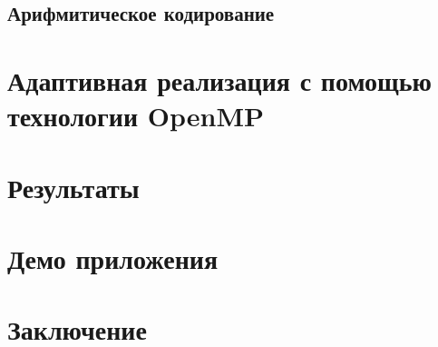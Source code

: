 \documentclass{matmex-diploma-custom}
\begin{document}
\subsection{Арифмитическое кодирование}
\section{Адаптивная реализация с помощью технологии OpenMP}
\section{Результаты}
\section{Демо приложения}

\section*{Заключение}



\end{document}
